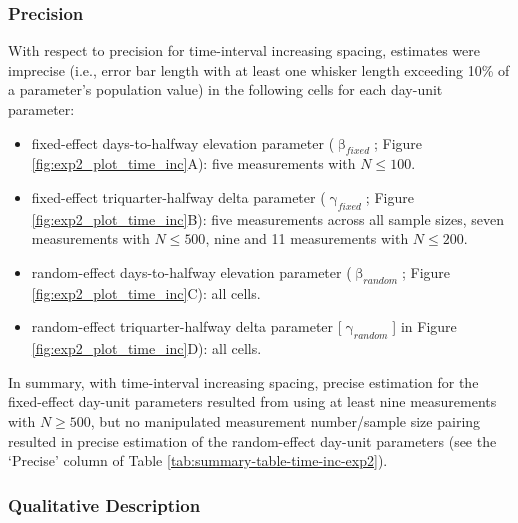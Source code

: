 \documentclass[
12pt, %
twoside,
english]{guelphthesis}
\begin{document}
\hypertarget{precision-time-inc-exp2}{%
\subsubsection{Precision}\label{precision-time-inc-exp2}}

With respect to precision for time-interval increasing spacing, estimates were imprecise (i.e., error bar length with at least one whisker length exceeding 10\% of a parameter's population value) in the following cells for each day-unit parameter:
\begin{itemize}
\tightlist
\item
  fixed-effect days-to-halfway elevation parameter (\(\upbeta_{fixed}\); Figure \ref{fig:exp2_plot_time_inc}A): five measurements with \(N \le 100\).
\item
  fixed-effect triquarter-halfway delta parameter (\(\upgamma_{fixed}\); Figure \ref{fig:exp2_plot_time_inc}B): five measurements across all sample sizes, seven measurements with \(N \le 500\), nine and 11 measurements with \(N \le 200\).
\item
  random-effect days-to-halfway elevation parameter (\(\upbeta_{random}\); Figure \ref{fig:exp2_plot_time_inc}C): all cells.
\item
  random-effect triquarter-halfway delta parameter {[}\(\upgamma_{random}\){]} in Figure \ref{fig:exp2_plot_time_inc}D): all cells.
\end{itemize}
In summary, with time-interval increasing spacing, precise estimation for the fixed-effect day-unit parameters resulted from using at least nine measurements with \(N \ge 500\), but no manipulated measurement number/sample size pairing resulted in precise estimation of the random-effect day-unit parameters (see the `Precise' column of Table \ref{tab:summary-table-time-inc-exp2}).

\hypertarget{qualitative-time-inc-exp2}{%
\subsubsection{Qualitative Description}\label{qualitative-time-inc-exp2}}
\end{document}
